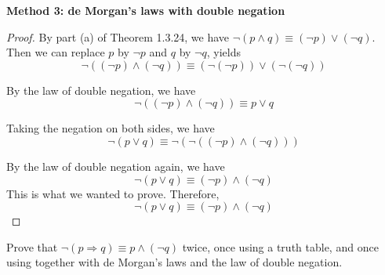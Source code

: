 \begin{solutions*}
    \textbf{Method 3: de Morgan's laws with double negation}
    \begin{proof}
        By part (a) of Theorem 1.3.24, we have $\neg (p \wedge q) \equiv (\neg p) \vee (\neg q)$. Then we can replace $p$ by $\neg p$ and $q$ by $\neg q$, yields
        \[\neg ((\neg p) \wedge (\neg q)) \equiv (\neg (\neg p)) \vee (\neg (\neg q))\]

        By the law of double negation, we have
        \[\neg ((\neg p) \wedge (\neg q)) \equiv p \vee q\]

        Taking the negation on both sides, we have
        \[\neg (p \vee q) \equiv \neg(\neg ((\neg p) \wedge (\neg q)))\]

        By the law of double negation again, we have
        \[\neg (p \vee q) \equiv (\neg p) \wedge (\neg q)\]
        This is what we wanted to prove. Therefore,
         \[\neg (p \vee q) \equiv (\neg p) \wedge (\neg q)\]
    \end{proof}
\end{solutions*}


\begin{exercise}
\label{exNegationOfImplication}
Prove that $\neg (p \Rightarrow q) \equiv p \wedge (\neg q)$ twice, once using a truth table, and once using  together with de Morgan's laws and the law of double negation.
\end{exercise}

